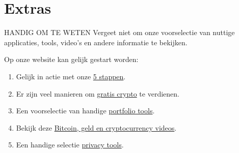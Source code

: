 \chapter{Extras}


\begin{cryptobox}{HANDIG OM TE WETEN}
Vergeet niet om onze voorselectie van nuttige applicaties, tools, video's en andere informatie te bekijken.

\tcblower
Op onze website kan gelijk gestart worden:
\begin{enumerate}
    \setlength\itemsep{0em}
    \item Gelijk in actie met onze \href{https://cryptomanuals.com/start-with-cryptocurrency/}{5 stappen}.
    \item Er zijn veel manieren om  \href{https://cryptomanuals.com/free-cryptomanuals/}{gratis crypto} te verdienen.
    \item Een voorselectie van handige \href{https://cryptomanuals.com/5-tools-to-buy-trade-and-manage-your-crypto-portfolio/}{portfolio tools}.
    \item Bekijk deze  \href{https://cryptomanuals.com/5-videos-to-start-with-bitcoin/}{Bitcoin, geld en cryptocurrency videos}.
    \item Een handige selectie  \href{https://cryptomanuals.com/5-applications-to-enhance-online-privacy-and-security/}{privacy tools}.
  \end{enumerate}
\end{cryptobox}